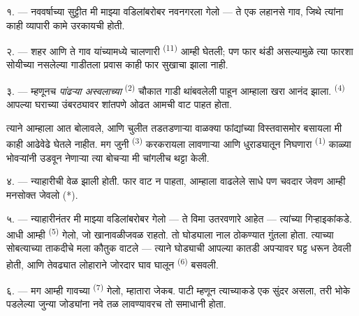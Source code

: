 
\VUsaut{4.0mm}
\VUsaut{3.0mm}
\VUfilet{16mm}
\VUsaut{5.6mm}
\VUsaut{3.0mm}

\VUsaut{3.0mm}

\VUsaut{4.0mm}

१. --- नववर्षाच्या सुट्टीत मी माझ्या वडिलांबरोबर नवनगरला गेलो — ते एक लहानसे गाव, जिथे त्यांना
काही व्यापारी कामे उरकायची होती.

२. --- शहर आणि ते गाव यांच्यामध्ये चालणारी  \textsuperscript{(11)} आम्ही
घेतली; पण फार थंडी असल्यामुळे त्या फारशा सोयीच्या नसलेल्या गाडीतला प्रवास काही फार सुखाचा झाला
नाही.

३. --- म्हणूनच  \textit{पांढऱ्या अस्वलाच्या} 
\textsuperscript{(2)} चौकात गाडी थांबवलेली पाहून आम्हाला खरा आनंद झाला. 
\textsuperscript{(4)} आपल्या घराच्या उंबरठ्यावर शांतपणे  ओढत आमची वाट पाहत होता.

त्याने आम्हाला आत बोलावले, आणि चुलीत तडतडणाऱ्या वाळक्या फांद्यांच्या विस्तवासमोर बसायला मी
काही आढेवेढे घेतले नाहीत. मग जुनी  \textsuperscript{(3)} करकरायला लावणाऱ्या आणि
धुराड्यातून निघणारा  \textsuperscript{(1)} काळ्या भोवऱ्यांनी उडवून नेणाऱ्या त्या
बोचऱ्या  मी चांगलीच थट्टा केली.

४. --- न्याहारीची वेळ झाली होती. फार वाट न पाहता, आम्हाला वाढलेले साधे पण चवदार जेवण आम्ही
मनसोक्त जेवलो (*).

\VUsaut{3.0mm}

५. --- न्याहारीनंतर मी माझ्या वडिलांबरोबर गेलो — ते विमा उतरवणारे आहेत — त्यांच्या
गिऱ्हाइकांकडे. आधी आम्ही  \textsuperscript{(5)} गेलो, जो खानावळीजवळ राहतो.
तो घोड्याला नाल ठोकण्यात गुंतला होता. त्याच्या सोबत्याच्या ताकदीचे मला कौतुक वाटले — त्याने
घोड्याची  आपल्या कातडी अपऱ्यावर घट्ट धरून ठेवली होती, आणि तेवढ्यात लोहाराने जोरदार
घाव घालून  \textsuperscript{(6)} बसवली.

६. --- मग आम्ही गावच्या  \textsuperscript{(7)} गेलो, म्हातारा जेकब. पाटी
म्हणून त्याच्याकडे एक सुंदर  असला, तरी भोके पडलेल्या जुन्या जोड्यांना नवे तळ
लावण्यावरच तो समाधानी होता.


